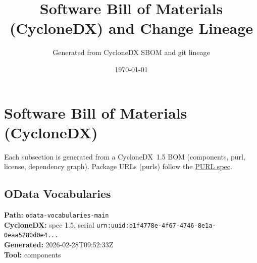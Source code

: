 \documentclass[11pt,a4paper]{article}
\title{\textbf{Software Bill of Materials (CycloneDX) and Change Lineage}}
\author{Generated from CycloneDX SBOM and git lineage}
\date{\today}
\begin{document}
\maketitle
\tableofcontents
\newpage
\section{Software Bill of Materials (CycloneDX)}
Each subsection is generated from a CycloneDX~1.5 BOM (components, purl, license, dependency graph). Package URLs (purls) follow the \href{https://github.com/package-url/purl-spec}{PURL spec}.

\subsection{OData Vocabularies}
\textbf{Path:} \texttt{odata-vocabularies-main}
\\ \textbf{CycloneDX:} spec 1.5, serial \texttt{urn:uuid:b1f4778e-4f67-4746-8e1a-0eaa5280d0e4...}
\\ \textbf{Generated:} 2026-02-28T09:52:33Z
\\ \textbf{Tool:} components
\end{document}
